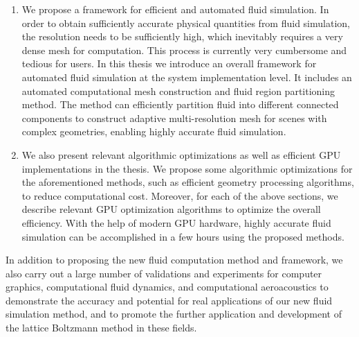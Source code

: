 \begin{abstract*}[flattitle]
\begin{enumerate}
    \item We propose a framework for efficient and automated fluid simulation. In order to obtain sufficiently accurate physical quantities from fluid simulation, the resolution needs to be sufficiently high, which inevitably requires a very dense mesh for computation. This process is currently very cumbersome and tedious for users. In this thesis we introduce an overall framework for automated fluid simulation at the system implementation level. It includes an automated computational mesh construction and fluid region partitioning method. The method can efficiently partition fluid into different connected components to construct adaptive multi-resolution mesh for scenes with complex geometries, enabling highly accurate fluid simulation.
    \item We also present relevant algorithmic optimizations as well as efficient GPU implementations in the thesis. We propose some algorithmic optimizations for the aforementioned methods, such as efficient geometry processing algorithms, to reduce computational cost. Moreover, for each of the above sections, we describe relevant GPU optimization algorithms to optimize the overall efficiency. With the help of modern GPU hardware, highly accurate fluid simulation can be accomplished in a few hours using the proposed methods.
  \end{enumerate}

  In addition to proposing the new fluid computation method and framework, we also carry out a large number of validations and experiments for computer graphics, computational fluid dynamics, and computational aeroacoustics to demonstrate the accuracy and potential for real applications of our new fluid simulation method, and to promote the further application and development of the lattice Boltzmann method in these fields.
\end{abstract*}
